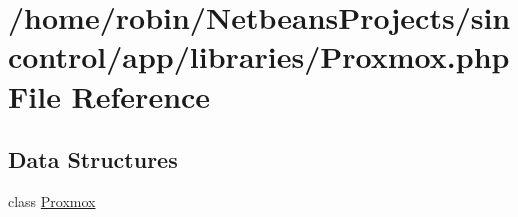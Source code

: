 \hypertarget{_proxmox_8php}{}\section{/home/robin/\+Netbeans\+Projects/sincontrol/app/libraries/\+Proxmox.php File Reference}
\label{_proxmox_8php}
\subsection*{Data Structures}
\begin{DoxyCompactItemize}
\item 
class \hyperlink{class_proxmox}{Proxmox}
\end{DoxyCompactItemize}
